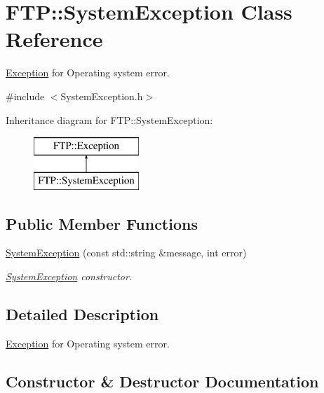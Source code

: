 \hypertarget{classFTP_1_1SystemException}{}\section{F\+T\+P\+:\+:System\+Exception Class Reference}
\label{classFTP_1_1SystemException}


\hyperlink{classFTP_1_1Exception}{Exception} for Operating system error.  




{\ttfamily \#include $<$System\+Exception.\+h$>$}

Inheritance diagram for F\+T\+P\+:\+:System\+Exception\+:\begin{figure}[H]
\begin{center}
\leavevmode
\includegraphics[height=2.000000cm]{classFTP_1_1SystemException}
\end{center}
\end{figure}
\subsection*{Public Member Functions}
\begin{DoxyCompactItemize}
\item 
\hyperlink{classFTP_1_1SystemException_a155bdb10f7e02738979d00e0510554fb}{System\+Exception} (const std\+::string \&message, int error)
\begin{DoxyCompactList}\small\item\em \hyperlink{classFTP_1_1SystemException}{System\+Exception} constructor. \end{DoxyCompactList}\end{DoxyCompactItemize}


\subsection{Detailed Description}
\hyperlink{classFTP_1_1Exception}{Exception} for Operating system error. 

\subsection{Constructor \& Destructor Documentation}
\hypertarget{classFTP_1_1SystemException_a155bdb10f7e02738979d00e0510554fb}{}
